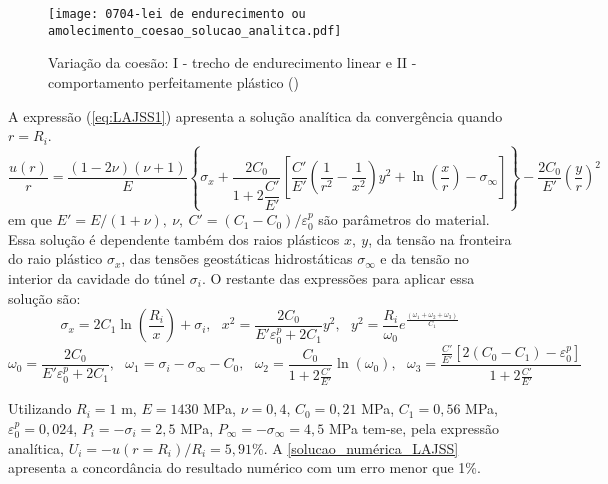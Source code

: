 \begin{figure}[H]
	\begin{center}
		\texttt{[image: 0704-lei de endurecimento ou amolecimento\_coesao\_solucao\_analitca.pdf]}
	\end{center}
	\caption{\label{coesao_solucao_analitca_LAJSS}Variação da coesão: I - trecho de endurecimento linear e II - comportamento perfeitamente plástico ()}
\end{figure}
A expressão (\ref{eq:LAJSS1}) apresenta a solução analítica da convergência quando $r=R_i$.
\begin{equation}
	\label{eq:LAJSS1}
	\dfrac{u(r)}{r} = \dfrac{(1-2\nu)(\nu+1)}{E}\left\{\sigma_x+\dfrac{2C_0}{1+2\dfrac{C'}{E'}}\left[\dfrac{C'}{E'}\left(\dfrac{1}{r^2}-\dfrac{1}{x^2}\right) y^2+\ln{\left(\dfrac{x}{r}\right)-\sigma_\infty} \right]  \right\}-\dfrac{2C_0}{E'}\left(\dfrac{y}{r}\right)^2
\end{equation}
em que $E'=E/(1+\nu),~\nu,~C' = (C_1-C_0)/\varepsilon_0^p$ são parâmetros do material. Essa solução é dependente também dos raios plásticos $x,~y$, da tensão na fronteira do raio plástico $\sigma_x$, das tensões geostáticas hidrostáticas $\sigma_\infty$ e da tensão no interior da cavidade do túnel $\sigma_i$. O restante das expressões para aplicar essa solução são:
\begin{equation} \label{eq:LAJSS2}
	{{\sigma }_{x}}=2{{C}_{1}}\ln \left( \frac{{{R}_{i}}}{x} \right)+{{\sigma }_{i}},~~~ 	{{x}^{2}}=\frac{2{{C}_{0}}}{E'\varepsilon _{0}^{p}+2{{C}_{1}}}{{y}^{2}}, ~~~ 	{{y}^{2}}=\frac{{{R}_{i}}}{{{\omega }_{0}}}{{e}^{\frac{({{\omega }_{1}}+{{\omega }_{2}}+{{\omega }_{3}})}{{{C}_{1}}}}} 
\end{equation}
\begin{equation} \label{eq:LAJSS3}
	{{\omega }_{0}}=\frac{2{{C}_{0}}}{E'\varepsilon _{0}^{p}+2{{C}_{1}}}, ~~~ 	{{\omega }_{1}}={{\sigma }_{i}}-{{\sigma }_{\infty }}-{{C}_{0}} , ~~~ {{\omega }_{2}}=\frac{{{C}_{0}}}{1+2\frac{C'}{E'}}\ln ({{\omega }_{0}}), ~~~ 	{{\omega }_{3}}=\frac{\frac{C'}{E'}\left[ 2({{C}_{0}}-{{C}_{1}})-\varepsilon _{0}^{p} \right]}{1+2\frac{C'}{E'}}
\end{equation}

Utilizando $R_i=1$ m, $E=1430$ MPa, $\nu = 0,4$, $C_0=0,21$ MPa, $C_1=0,56$ MPa, $\varepsilon _{0}^{p}=0,024$, $P_i = -\sigma_i = 2,5$ MPa, $ P_\infty = -\sigma_\infty = 4,5$ MPa tem-se, pela expressão analítica, $U_i = - u(r=R_i)/R_i = 5,91$\%. A \autoref{solucao_numérica_LAJSS} apresenta a concordância do resultado numérico com um erro menor que 1\%.

